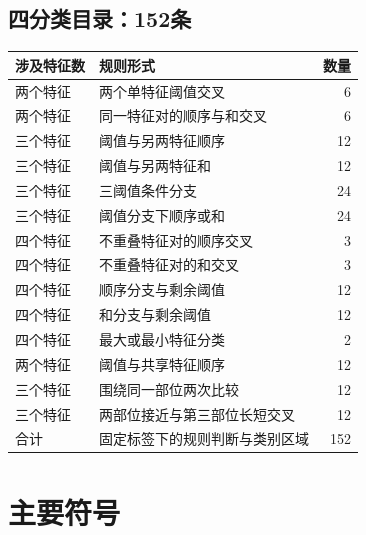 \documentclass[11pt,a4paper]{article}
\numberwithin{equation}{section}
\begin{document}
\subsection{四分类目录：152条}
{\small
\begin{longtable}{L{2.6cm}L{11.1cm}r}
\toprule
涉及特征数 & 规则形式 & 数量\\
\midrule\endhead
两个特征 & 两个单特征阈值交叉 & 6\\
两个特征 & 同一特征对的顺序与和交叉 & 6\\
三个特征 & 阈值与另两特征顺序 & 12\\
三个特征 & 阈值与另两特征和 & 12\\
三个特征 & 三阈值条件分支 & 24\\
三个特征 & 阈值分支下顺序或和 & 24\\
四个特征 & 不重叠特征对的顺序交叉 & 3\\
四个特征 & 不重叠特征对的和交叉 & 3\\
四个特征 & 顺序分支与剩余阈值 & 12\\
四个特征 & 和分支与剩余阈值 & 12\\
四个特征 & 最大或最小特征分类 & 2\\
两个特征 & 阈值与共享特征顺序 & 12\\
三个特征 & 围绕同一部位两次比较 & 12\\
三个特征 & 两部位接近与第三部位长短交叉 & 12\\
\midrule
合计 & 固定标签下的规则判断与类别区域 & 152\\
\bottomrule
\end{longtable}}

\clearpage
\section{主要符号}
\label{app:symbols}
\end{document}
